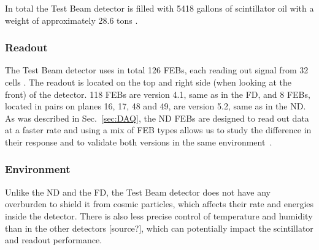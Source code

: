 
In total the Test Beam detector is filled with 5418 gallons of scintillator oil with a weight of approximately 28.6 tons \cite{NOvA-doc-29543}.

\subsubsection*{Readout}
The Test Beam detector uses in total 126 \glspl{FEB}, each reading out signal from 32 cells \cite{NOvA-doc-29543}. The readout is located on the top and right side (when looking at the front) of the detector. 118 \glspl{FEB} are version 4.1, same as in the \gls{FD}, and 8 \glspl{FEB}, located in pairs on planes 16, 17, 48 and 49, are version 5.2, same as in the \gls{ND}. As was described in Sec.~\ref{sec:DAQ}, the \gls{ND} \glspl{FEB} are designed to read out data at a faster rate and using a mix of \gls{FEB} types allows us to study the difference in their response and to validate both versions in the same environment~\cite{LackeyThesisNOvATBProtons2022.pdf}.


\subsubsection*{Environment}
Unlike the \gls{ND} and the \gls{FD}, the Test Beam detector does not have any overburden to shield it from cosmic particles, which affects their rate and energies inside the detector. There is also less precise control of temperature and humidity than in the other detectors [source?], which can potentially impact the scintillator and readout performance.

